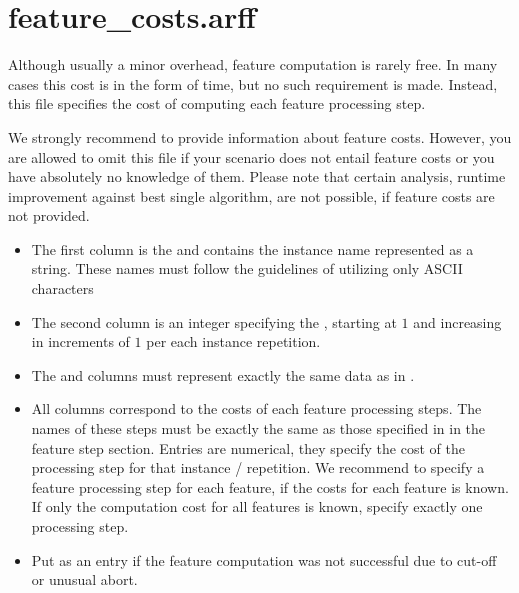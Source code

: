 \documentclass[]{elsarticle}
\begin{document}
\section{feature\_costs.arff}

Although usually a minor overhead, feature computation is rarely free. In many cases this cost is in the form of 
time, but no such requirement is made. Instead, this file specifies the cost of computing each feature processing step. 

We strongly recommend to provide information about feature costs.
However, you are allowed to omit this file if your scenario does not entail feature costs or you have absolutely no knowledge 
of them. Please note that certain analysis, \eg{} runtime improvement against best single algorithm, are not possible,
if feature costs are not provided.  

\begin{itemize}
  	\item The first column is the  and contains the instance name represented as a string.
  		 These names must follow the guidelines of utilizing only ASCII characters
  	\item The second column is an integer specifying the , starting at $1$ and increasing in 
		increments of $1$ per each instance repetition. 
  	\item The  and  columns must represent exactly the same data 
		as in .
  	\item All columns correspond to the costs of each feature processing steps. The names of these
		steps must be exactly the same as those specified in  in the feature 
		step section. Entries are numerical, they specify the cost of the processing step for that 
		instance / repetition. We recommend to specify a feature processing step for each feature, if
		the costs for each feature is known. If only the computation cost for all features is known,
		specify exactly one processing step.
  	\item Put \qm as an entry if the feature computation was not successful due to cut-off or unusual abort.
\end{itemize}
\end{document}
